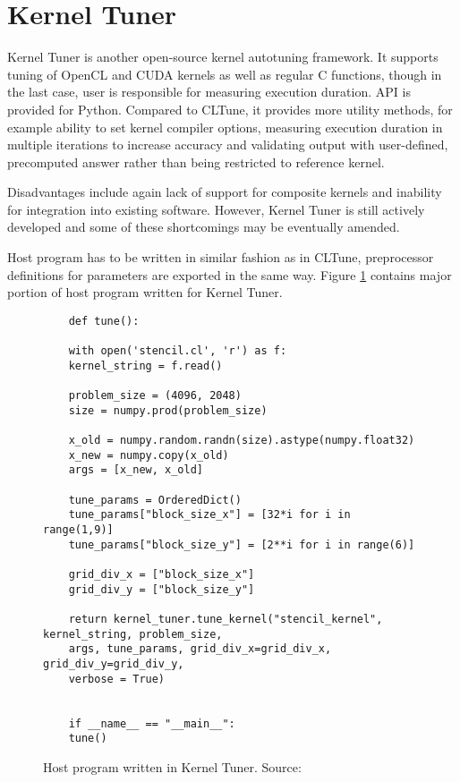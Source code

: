 \documentclass
[
    digital, %
    oneside, %
    table, %
    nolof, %
    nolot, %
    nocover %
]{fithesis3}
\begin{document}
\section{Kernel Tuner}
Kernel Tuner \cite{kerneltuner} is another open-source kernel autotuning framework. It supports tuning of OpenCL and CUDA kernels as well as regular
C functions, though in the last case, user is responsible for measuring execution duration. API is provided for Python. Compared to CLTune, it
provides more utility methods, for example ability to set kernel compiler options, measuring execution duration in multiple iterations to increase
accuracy and validating output with user-defined, precomputed answer rather than being restricted to reference kernel.

Disadvantages include again lack of support for composite kernels and inability for integration into existing software. However, Kernel Tuner is still
actively developed and some of these shortcomings may be eventually amended.

Host program has to be written in similar fashion as in CLTune, preprocessor definitions for parameters are exported in the same way. Figure
\ref{kerneltuner-example} contains major portion of host program written for Kernel Tuner.
\begin{figure}
    \begin{lstlisting}
    def tune():
    
    with open('stencil.cl', 'r') as f:
    kernel_string = f.read()
    
    problem_size = (4096, 2048)
    size = numpy.prod(problem_size)
    
    x_old = numpy.random.randn(size).astype(numpy.float32)
    x_new = numpy.copy(x_old)
    args = [x_new, x_old]
    
    tune_params = OrderedDict()
    tune_params["block_size_x"] = [32*i for i in range(1,9)]
    tune_params["block_size_y"] = [2**i for i in range(6)]
    
    grid_div_x = ["block_size_x"]
    grid_div_y = ["block_size_y"]
    
    return kernel_tuner.tune_kernel("stencil_kernel", kernel_string, problem_size,
    args, tune_params, grid_div_x=grid_div_x, grid_div_y=grid_div_y,
    verbose = True)
    
    
    if __name__ == "__main__":
    tune()
    \end{lstlisting}
    \caption{Host program written in Kernel Tuner. Source: \cite{kerneltuner-example}}
    \label{kerneltuner-example}
\end{figure}
\end{document}
